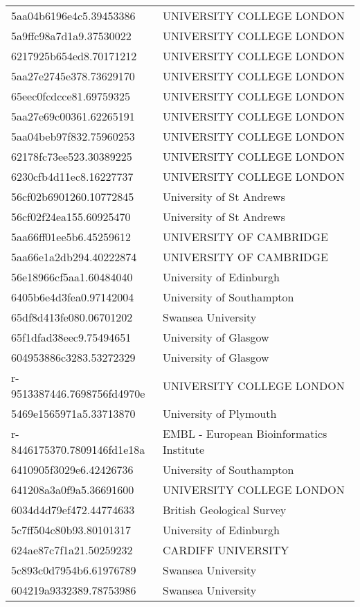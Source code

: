 \begin{tabular}{ll}
5aa04b6196e4c5.39453386 & UNIVERSITY COLLEGE LONDON \\
5a9ffc98a7d1a9.37530022 & UNIVERSITY COLLEGE LONDON \\
6217925b654ed8.70171212 & UNIVERSITY COLLEGE LONDON \\
5aa27e2745e378.73629170 & UNIVERSITY COLLEGE LONDON \\
65eec0fcdcce81.69759325 & UNIVERSITY COLLEGE LONDON \\
5aa27e69c00361.62265191 & UNIVERSITY COLLEGE LONDON \\
5aa04beb97f832.75960253 & UNIVERSITY COLLEGE LONDON \\
62178fc73ee523.30389225 & UNIVERSITY COLLEGE LONDON \\
6230cfb4d11ec8.16227737 & UNIVERSITY COLLEGE LONDON \\
56cf02b6901260.10772845 & University of St Andrews \\
56cf02f24ea155.60925470 & University of St Andrews \\
5aa66ff01ee5b6.45259612 & UNIVERSITY OF CAMBRIDGE \\
5aa66e1a2db294.40222874 & UNIVERSITY OF CAMBRIDGE \\
56e18966cf5aa1.60484040 & University of Edinburgh \\
6405b6e4d3fea0.97142004 & University of Southampton \\
65df8d413fe080.06701202 & Swansea University \\
65f1dfad38eec9.75494651 & University of Glasgow \\
604953886c3283.53272329 & University of Glasgow \\
r-9513387446.7698756fd4970e & UNIVERSITY COLLEGE LONDON \\
5469e1565971a5.33713870 & University of Plymouth \\
r-8446175370.7809146fd1e18a & EMBL - European Bioinformatics Institute \\
6410905f3029e6.42426736 & University of Southampton \\
641208a3a0f9a5.36691600 & UNIVERSITY COLLEGE LONDON \\
6034d4d79ef472.44774633 & British Geological Survey \\
5c7ff504c80b93.80101317 & University of Edinburgh \\
624ae87c7f1a21.50259232 & CARDIFF UNIVERSITY \\
5c893c0d7954b6.61976789 & Swansea University \\
604219a9332389.78753986 & Swansea University \\

\end{tabular}
